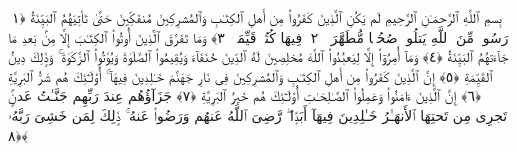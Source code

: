 
  
    
  
    
    

\nopagebreak
  بِسمِ ٱللَّهِ ٱلرَّحمَـٰنِ ٱلرَّحِيمِ
  لَم يَكُنِ ٱلَّذِينَ كَفَرُوا۟ مِن أَهلِ ٱلكِتَـٰبِ وَٱلمُشرِكِينَ مُنفَكِّينَ حَتَّىٰ تَأتِيَهُمُ ٱلبَيِّنَةُ ﴿١﴾
 رَسُولٌۭ مِّنَ ٱللَّهِ يَتلُوا۟ صُحُفًۭا مُّطَهَّرَةًۭ ﴿٢﴾
 فِيهَا كُتُبٌۭ قَيِّمَةٌۭ ﴿٣﴾
 وَمَا تَفَرَّقَ ٱلَّذِينَ أُوتُوا۟ ٱلكِتَـٰبَ إِلَّا مِنۢ بَعدِ مَا جَآءَتهُمُ ٱلبَيِّنَةُ ﴿٤﴾
 وَمَآ أُمِرُوٓا۟ إِلَّا لِيَعبُدُوا۟ ٱللَّهَ مُخلِصِينَ لَهُ ٱلدِّينَ حُنَفَآءَ وَيُقِيمُوا۟ ٱلصَّلَوٰةَ وَيُؤتُوا۟ ٱلزَّكَوٰةَ ۚ وَذَٟلِكَ دِينُ ٱلقَيِّمَةِ ﴿٥﴾
 إِنَّ ٱلَّذِينَ كَفَرُوا۟ مِن أَهلِ ٱلكِتَـٰبِ وَٱلمُشرِكِينَ فِى نَارِ جَهَنَّمَ خَـٰلِدِينَ فِيهَآ ۚ أُو۟لَـٰٓئِكَ هُم شَرُّ ٱلبَرِيَّةِ ﴿٦﴾
 إِنَّ ٱلَّذِينَ ءَامَنُوا۟ وَعَمِلُوا۟ ٱلصَّـٰلِحَـٰتِ أُو۟لَـٰٓئِكَ هُم خَيرُ ٱلبَرِيَّةِ ﴿٧﴾
 جَزَآؤُهُم عِندَ رَبِّهِم جَنَّـٰتُ عَدنٍۢ تَجرِى مِن تَحتِهَا ٱلأَنهَـٰرُ خَـٰلِدِينَ فِيهَآ أَبَدًۭا ۖ رَّضِىَ ٱللَّهُ عَنهُم وَرَضُوا۟ عَنهُ ۚ ذَٟلِكَ لِمَن خَشِىَ رَبَّهُۥ ﴿٨﴾
 
